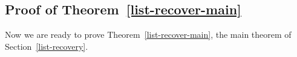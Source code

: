 \documentclass[11pt]{article}
\newtheorem*{theorem*}{Theorem}
\renewcommand{\epsilon}{\varepsilon}
\newcommand{\N}{{\mathbb{N}}}
\begin{document}
\subsection{Proof of Theorem~\ref{list-recover-main}}

Now we are ready to prove Theorem~\ref{list-recover-main}, the main theorem of Section~\ref{list-recovery}.
%
%
\end{document}
